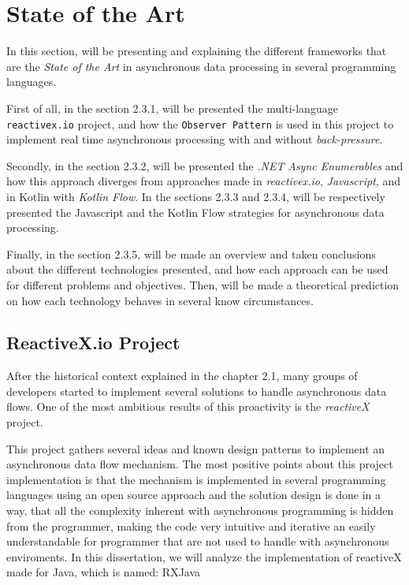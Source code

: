 
\section{State of the Art} %
\label{sec:state_of_the_art}

In this section, will be presenting and explaining the different frameworks that are the \textit{State of the Art} in asynchronous data processing in several programming languages.

First of all, in the section 2.3.1, will be presented the multi-language \texttt{reactivex.io} project, and how the \texttt{Observer Pattern} is used in this project to implement real time asynchronous processing with and without \textit{back-pressure}.

Secondly, in the section 2.3.2, will be presented the \textit{.NET} \textit{Async Enumerables} and how this approach diverges from approaches made in \textit{reactivex.io}, \textit{Javascript}, and in Kotlin with \textit{Kotlin Flow}.
In the sections 2.3.3 and 2.3.4, will be respectively presented the Javascript and the Kotlin Flow strategies for asynchronous data processing.

Finally, in the section 2.3.5, will be made an overview and taken conclusions about the different technologies presented, and how each approach can be used for different problems and objectives. Then, will be made a theoretical prediction on how each technology behaves in several know circumstances. 



\subsection{ReactiveX.io Project}

After the historical context explained in the chapter 2.1, many groups of developers started to implement several solutions to handle asynchronous data flows. One of the most ambitious results of this proactivity is the \textit{reactiveX} project.

This project gathers several ideas and known design patterns to implement an asynchronous data flow mechanism. 
The most positive points about this project implementation is that the mechanism is implemented in several programming languages using an open source approach and the solution design is done in a way, that all the complexity inherent with asynchronous programming is hidden from the programmer, making the code very intuitive and iterative an easily understandable for programmer that are not used to handle with asynchronous enviroments. 
In this dissertation, we will analyze the implementation of reactiveX made for Java, which is named: RXJava

